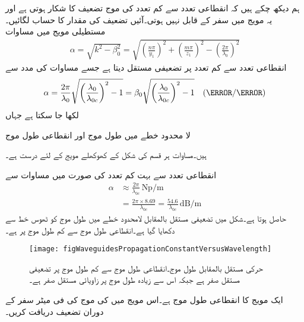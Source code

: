 ہم دیکھ چکے  ہیں کہ انقطاعی تعدد سے کم تعدد کی موج تضعیف کا شکار ہوتی ہے اور یہ مویج میں سفر کے قابل نہیں ہوتی۔آئیں تضعیف کی مقدار کا حساب لگائیں۔مستطیلی مویج میں مساوات 
\begin{align}
\alpha=\sqrt{k^2-\beta_0^2}=\sqrt{\left(\frac{n\pi}{y_1}\right)^2+\left(\frac{m\pi}{z_1}\right)^2-\left(\frac{2\pi}{\lambda_0}\right)^2}
\end{align}
 انقطاعی تعدد سے کم تعدد پر تضعیفی مستقل دیتا ہے جسے مساوات  کی مدد سے
\begin{align}\label{مساوات_مویج_تضعیفی_مستقل_عمومی_مساوات}
\alpha=\frac{2\pi}{\lambda_0}\sqrt{\left(\frac{\lambda_0}{\lambda_{0c}}\right)^2-1}=\beta_0 \sqrt{\left(\frac{\lambda_0}{\lambda_{0c}}\right)^2-1} \quad (\neper/\meter)
\end{align}
لکھا جا سکتا ہے جہاں
\begin{description}
 لا محدود خطے میں طول موج اور
 انقطاعی طول موج
\end{description}
ہیں۔مساوات  ہر قسم کی  شکل کے کھوکھلے مویج کے لئے درست ہے۔

انقطاعی تعدد سے بہت کم تعدد  کی صورت میں مساوات  سے
\begin{align}
\alpha &\approx \frac{2\pi}{\lambda_{0c}} \, \si{\neper/\meter}\\
&=\frac{2\pi \times 8.69}{\lambda_{0c}}=\frac{54.6}{\lambda_{0c}} \, \si{\deci\bel\per\meter}
\end{align}
حاصل ہوتا ہے۔شکل  میں تضعیفی مستقل  بالمقابل لامحدود خطے میں طول موج  کو ٹھوس خط سے دکھایا گیا ہے۔انقطاعی طول موج سے کم طول موج پر  ہے۔

\begin{figure}
\centering
\texttt{[image: figWaveguidesPropagationConstantVersusWavelength]}
\caption{حرکی مستقل بالمقابل طول موج۔انقطاعی طول موج سے  کم طول موج پر تضعیفی مستقل صفر ہے جبکہ اس سے زیادہ طول موج پر زاویائی مستقل صفر ہے۔}
\label{شکل_مویج_حرکی_مستقل_بالمقابل_طول_موج}
\end{figure}

ایک مویج کا انقطاعی طول موج  ہے۔اس مویج میں  کی موج کی فی میٹر سفر کے دوران تضعیف دریافت کریں۔

